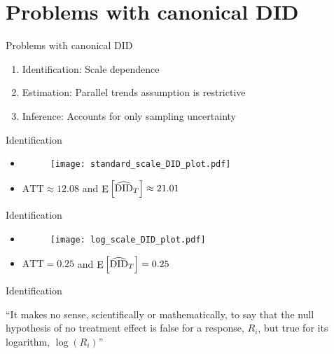 \documentclass[table, xcolor = {dvipsnames}, 9pt]{beamer}
\theoremstyle{plain}
\DeclareMathOperator{\E}{\rm{E}}
\begin{document}
\section{Problems with canonical DID}
\begin{frame}{Problems with canonical DID}
\vfill
\begin{enumerate} \vfill
\item Identification: Scale dependence \vfill
\item Estimation: Parallel trends assumption is restrictive \vfill
\item Inference: Accounts for only sampling uncertainty \vfill
\end{enumerate} \vfill
\end{frame}
\begin{frame}{Identification}
\begin{itemize}
\item[] 
\begin{figure}[H]
\texttt{[image: standard\_scale\_DID\_plot.pdf]}
\end{figure}
\item $\text{ATT} \approx 12.08$ and $\E\left[\widehat{\text{DID}}_{T}\right] \approx 21.01$ 
\end{itemize}
\end{frame}
\begin{frame}{Identification}
\begin{itemize}
\item[] 
\begin{figure}[H]
\texttt{[image: log\_scale\_DID\_plot.pdf]}
\end{figure}
\item $\text{ATT} = 0.25$ and $\E\left[\widehat{\text{DID}}_{T}\right] = 0.25$  
\end{itemize}
\end{frame}
\begin{frame}{Identification}
\begin{center}
``It makes no sense, scientifically or mathematically, to say that the null hypothesis of no treatment effect is false for a response, $R_i$, but true for its logarithm, $\log\left(R_i\right)$'' \citep[][p. 164]{rosenbaum2017}
\end{center}
\end{frame}
\end{document}
